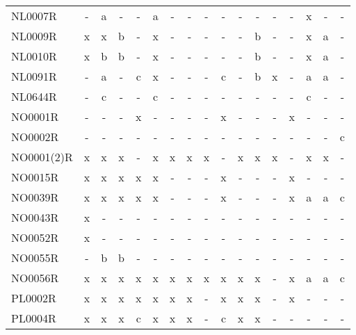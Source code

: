 \begin{table}
{{\begin{tabular}{l|cccccccccccccccc}
        NL0007R &  - &   a &    - &      - &   a &    - &    - &    - &      - &    - &    - &   - &      - &    x &    - &     - \\
        NL0009R &  x &   x &    b &      - &   x &    - &    - &    - &      - &    - &    b &   - &      - &    x &    a &     - \\
        NL0010R &  x &   b &    b &      - &   x &    - &    - &    - &      - &    - &    b &   - &      - &    x &    a &     - \\
        NL0091R &  - &   a &    - &      c &   x &    - &    - &    - &      c &    - &    b &   x &      - &    a &    a &     - \\
        NL0644R &  - &   c &    - &      - &   c &    - &    - &    - &      - &    - &    - &   - &      - &    c &    - &     - \\
        NO0001R &  - &   - &    - &      x &   - &    - &    - &    - &      x &    - &    - &   - &      x &    - &    - &     - \\
        NO0002R &  - &   - &    - &      - &   - &    - &    - &    - &      - &    - &    - &   - &      - &    - &    - &     c \\
NO0001(2)R &  x &   x &    x &      - &   x &    x &    x &    x &      - &    x &    x &   x &      - &    x &    x &     - \\
        NO0015R &  x &   x &    x &      x &   x &    - &    - &    - &      x &    - &    - &   - &      x &    - &    - &     - \\
        NO0039R &  x &   x &    x &      x &   x &    - &    - &    - &      x &    - &    - &   - &      x &    a &    a &     c \\
        NO0043R &  x &   - &    - &      - &   - &    - &    - &    - &      - &    - &    - &   - &      - &    - &    - &     - \\
        NO0052R &  x &   - &    - &      - &   - &    - &    - &    - &      - &    - &    - &   - &      - &    - &    - &     - \\
        NO0055R &  - &   b &    b &      - &   - &    - &    - &    - &      - &    - &    - &   - &      - &    - &    - &     - \\
        NO0056R &  x &   x &    x &      x &   x &    x &    x &    x &      x &    x &    x &   - &      x &    a &    a &     c \\
        PL0002R &  x &   x &    x &      x &   x &    x &    x &    - &      x &    x &    x &   - &      x &    - &    - &     - \\
        PL0004R &  x &   x &    x &      c &   x &    x &    x &    - &      c &    x &    x &   - &      - &    - &    - &     - \\

\end{tabular}}}
\end{table}
